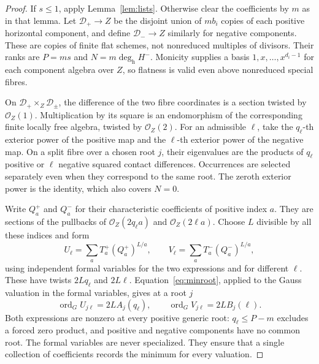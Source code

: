 \documentclass[11pt,reqno]{amsart}
\numberwithin{equation}{section}
\theoremstyle{definition}
\theoremstyle{remark}
\newcommand{\OO}{\mathcal O}
\newcommand{\ord}{\operatorname{ord}}
\newcommand{\degh}{\deg_{\mathrm h}}
\newcommand{\cD}{\mathcal D}
\begin{document}
\begin{proof}
If $s\le1$, apply Lemma~\ref{lem:lists}. Otherwise clear the coefficients by $m$ as in that lemma. Let $\cD_+\to Z$ be the disjoint union of $mb_i$ copies of each positive horizontal component, and define $\cD_-\to Z$ similarly for negative components. These are copies of finite flat schemes, not nonreduced multiples of divisors. Their ranks are $P=ms$ and $N=m\degh H^-$. Monicity supplies a basis $1,x,\ldots,x^{d_i-1}$ for each component algebra over $Z$, so flatness is valid even above nonreduced special fibres.

On $\cD_+\times_Z\cD_\pm$, the difference of the two fibre coordinates is a section twisted by $\OO_Z(1)$. Multiplication by its square is an endomorphism of the corresponding finite locally free algebra, twisted by $\OO_Z(2)$. For an admissible $\ell$, take the $q_\ell$-th exterior power of the positive map and the $\ell$-th exterior power of the negative map. On a split fibre over a chosen root $j$, their eigenvalues are the products of $q_\ell$ positive or $\ell$ negative squared contact differences. Occurrences are selected separately even when they correspond to the same root. The zeroth exterior power is the identity, which also covers $N=0$.

Write $Q_a^+$ and $Q_a^-$ for their characteristic coefficients of positive index $a$. They are sections of the pullbacks of $\OO_Z(2q_\ell a)$ and $\OO_Z(2\ell a)$. Choose $L$ divisible by all these indices and form
\[
 U_\ell=\sum_a T_a^+(Q_a^+)^{L/a},\qquad
 V_\ell=\sum_a T_a^-(Q_a^-)^{L/a},
\]
using independent formal variables for the two expressions and for different $\ell$. These have twists $2Lq_\ell$ and $2L\ell$. Equation~\eqref{eq:minroot}, applied to the Gauss valuation in the formal variables, gives at a root $j$
\begin{equation}\label{eq:gaussorders}
 \ord_G U_{j\ell}=2LA_j(q_\ell),\qquad
 \ord_G V_{j\ell}=2LB_j(\ell).
\end{equation}
Both expressions are nonzero at every positive generic root: $q_\ell\le P-m$ excludes a forced zero product, and positive and negative components have no common root. The formal variables are never specialized. They ensure that a single collection of coefficients records the minimum for every valuation.


\end{proof}
\end{document}

